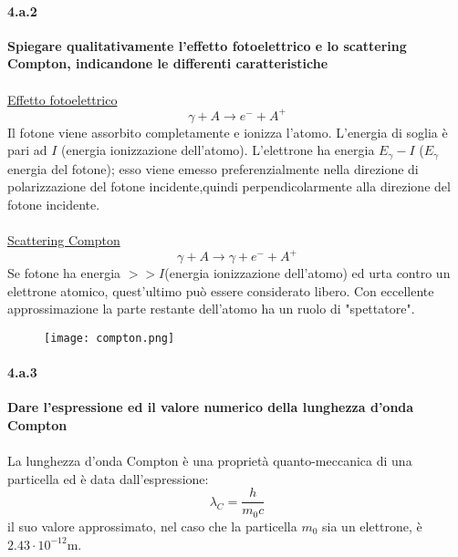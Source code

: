 \documentclass[twoside]{article}
\begin{document}
\paragraph{4.a.2}\textbf{Spiegare qualitativamente l’effetto fotoelettrico e lo scattering Compton, indicandone le differenti caratteristiche}\\
\\
\underline{Effetto fotoelettrico}\\
\begin{equation}
    \gamma + A \rightarrow e^- +A^+
\end{equation}
Il fotone viene assorbito completamente e ionizza l'atomo. L'energia di soglia è pari ad $I$ (energia ionizzazione dell'atomo). L'elettrone ha energia $E_{\gamma}-I$ ($E_{\gamma}$ energia del fotone); esso viene emesso preferenzialmente nella direzione di polarizzazione del fotone incidente,quindi perpendicolarmente alla direzione del fotone incidente.\\
\\
\underline{Scattering Compton}
\begin{equation}
  \gamma +A \rightarrow\gamma +e^- +A^+  
\end{equation}
Se fotone ha energia $>> I$(energia ionizzazione dell'atomo) ed urta contro un elettrone atomico, quest'ultimo può essere considerato libero. Con eccellente approssimazione la parte restante dell'atomo ha un ruolo di "spettatore".
\begin{figure}[H]
    \centering
    \texttt{[image: compton.png]}

\end{figure}
\paragraph{4.a.3}\textbf{Dare l'espressione ed il valore numerico della lunghezza d'onda Compton}\\
\\
La lunghezza d'onda Compton è una proprietà quanto-meccanica di una particella ed è data dall'espressione:
\begin{equation}
  \lambda_C=\frac{h}{m_0 c}  
\end{equation}
il suo valore approssimato, nel caso che la particella $m_0$ sia un elettrone, è $2.43 \cdot 10^{-12} $m. \\
\end{document}
